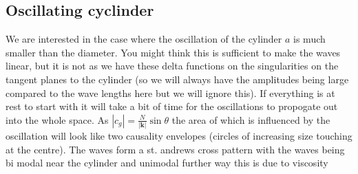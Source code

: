 \documentclass{article}
\begin{document}
\subsection{Oscillating cyclinder}
We are interested in the case where the oscillation of the cylinder $a$ is much smaller than the diameter. You might think this is sufficient to make the waves linear, but it is not as we have these delta functions on the singularities on the tangent planes to the cylinder (so we will always have the amplitudes being large compared to the wave lengths here but we will ignore this). If everything is at rest to start with it will take a bit of time for the oscillations to propogate out into the whole space. As $|c_g| = \frac{N}{|\bm k|} \sin \theta$ the area of which is influenced by the oscillation will look like two causality envelopes (circles of increasing size touching at the centre). The waves form a st. andrews cross pattern with the waves being bi modal near the cylinder and unimodal further way this is due to viscosity
\end{document}
